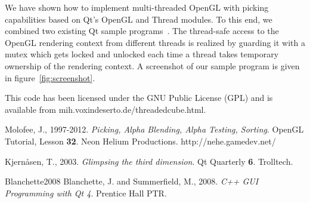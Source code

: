 \documentclass[jou,noapacite]{apa}
\begin{document}
We have shown how to implement multi-threaded OpenGL with picking capabilities
based on Qt's OpenGL and Thread modules.
%
To this end, we combined two existing Qt sample
programs~\cite{glimpse3d,Blanchette2008}.
%
The thread-safe access to the OpenGL rendering context from different threads
is realized by guarding it with a mutex which gets locked and unlocked each
time a thread takes temporary ownership of the rendering context.
%
A screenshot of our sample program is given in figure~\ref{fig:screenshot}.
%


This code has been licensed under the GNU Public License (GPL) and is available
from {\sf mih.voxindeserto.de/threadedcube.html}.







\begin{thebibliography}{10}


Molofee, J., 1997-2012. {\itshape Picking, Alpha Blending, Alpha Testing, Sorting}. OpenGL Tutorial, Lesson {\bf 32}. Neon Helium Productions. http://nehe.gamedev.net/


Kjern\r{a}sen, T., 2003. {\itshape Glimpsing the third dimension}. Qt Quarterly {\bf 6}. Trolltech.

\bibitem%
{Blanchette2008}
Blanchette, J. and Summerfield, M., 2008. {\itshape C++ GUI Programming with Qt
  4}.   Prentice Hall PTR.
\end{thebibliography}
\end{document}
